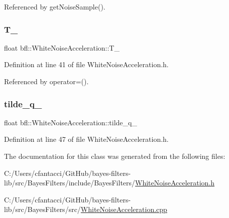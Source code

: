 Referenced by get\+Noise\+Sample().

\mbox{\label{classbfl_1_1WhiteNoiseAcceleration_a7d1674033e2b6b1b8f245e910163aa0a}} 
\subsubsection{\texorpdfstring{T\+\_\+}{T\_}}
{\footnotesize\ttfamily float bfl\+::\+White\+Noise\+Acceleration\+::\+T\+\_\+\hspace{0.3cm}{\ttfamily [protected]}}



Definition at line 41 of file White\+Noise\+Acceleration.\+h.



Referenced by operator=().

\mbox{\label{classbfl_1_1WhiteNoiseAcceleration_a5025cf01732a8ed99f4057fa6726f03e}} 
\subsubsection{\texorpdfstring{tilde\+\_\+q\+\_\+}{tilde\_q\_}}
{\footnotesize\ttfamily float bfl\+::\+White\+Noise\+Acceleration\+::tilde\+\_\+q\+\_\+\hspace{0.3cm}{\ttfamily [protected]}}



Definition at line 47 of file White\+Noise\+Acceleration.\+h.



The documentation for this class was generated from the following files\+:\begin{DoxyCompactItemize}
\item 
C\+:/\+Users/cfantacci/\+Git\+Hub/bayes-\/filters-\/lib/src/\+Bayes\+Filters/include/\+Bayes\+Filters/\mbox{\hyperlink{WhiteNoiseAcceleration_8h}{White\+Noise\+Acceleration.\+h}}\item 
C\+:/\+Users/cfantacci/\+Git\+Hub/bayes-\/filters-\/lib/src/\+Bayes\+Filters/src/\mbox{\hyperlink{WhiteNoiseAcceleration_8cpp}{White\+Noise\+Acceleration.\+cpp}}\end{DoxyCompactItemize}
